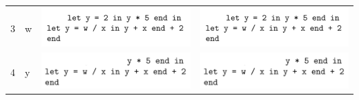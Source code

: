 \documentclass{article}
\begin{document}
\begin{enumerate}
{\begin{enumerate}
{\begin{table}[H]
\begin{tabular}{|l|l|l|l|}
\begin{minipage}{.3\textwidth}
            			\end{minipage}               \\ \hline
            				3   & w               & \begin{minipage}{.3\textwidth}
            					\includegraphics[width=\linewidth, height=.25\linewidth]{w1.png}
            				\end{minipage}                  &  \begin{minipage}{.3\textwidth}
            				\includegraphics[width=\linewidth, height=.25\linewidth]{w1.png}
            			\end{minipage}               \\ \hline
            				4   & y               &  \begin{minipage}{.3\textwidth}
            					\includegraphics[width=\linewidth, height=.25\linewidth]{y2.png}
            				\end{minipage}                 & \begin{minipage}{.3\textwidth}
            				\includegraphics[width=\linewidth, height=.25\linewidth]{y2.png}
            			\end{minipage}                \\ \hline

\end{tabular}
\end{table}}
\end{enumerate}}
\end{enumerate}
\end{document}
